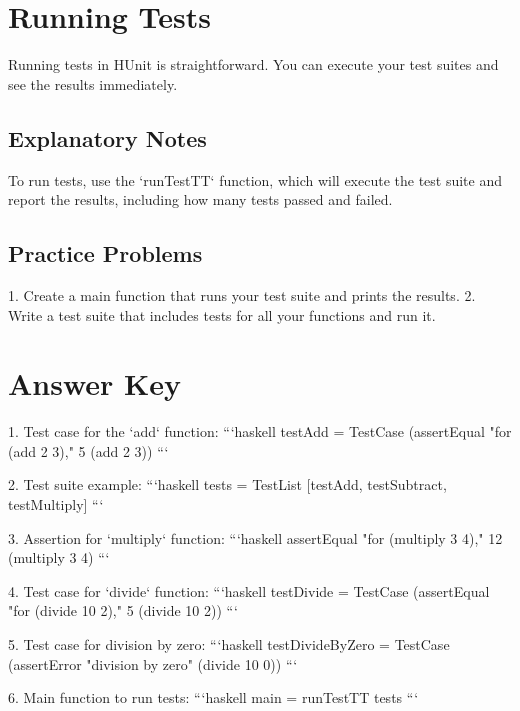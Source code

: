 \documentclass{article}
\begin{document}
\section*{Running Tests}
Running tests in HUnit is straightforward. You can execute your test suites and see the results immediately.

\subsection*{Explanatory Notes}
To run tests, use the `runTestTT` function, which will execute the test suite and report the results, including how many tests passed and failed.

\subsection*{Practice Problems}
1. Create a main function that runs your test suite and prints the results.
2. Write a test suite that includes tests for all your functions and run it.

\section*{Answer Key}
1. Test case for the `add` function:
   ```haskell
   testAdd = TestCase (assertEqual "for (add 2 3)," 5 (add 2 3))
   ```

2. Test suite example:
   ```haskell
   tests = TestList [testAdd, testSubtract, testMultiply]
   ```

3. Assertion for `multiply` function:
   ```haskell
   assertEqual "for (multiply 3 4)," 12 (multiply 3 4)
   ```

4. Test case for `divide` function:
   ```haskell
   testDivide = TestCase (assertEqual "for (divide 10 2)," 5 (divide 10 2))
   ```

5. Test case for division by zero:
   ```haskell
   testDivideByZero = TestCase (assertError "division by zero" (divide 10 0))
   ```

6. Main function to run tests:
   ```haskell
   main = runTestTT tests
   ```
\end{document}
